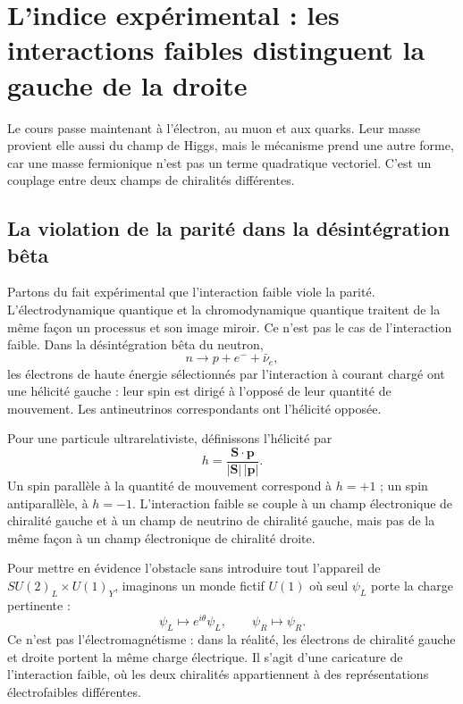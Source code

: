 \section{L’indice expérimental : les interactions faibles distinguent la gauche de la droite}

Le cours passe maintenant à l’électron, au muon et aux quarks. Leur masse provient elle aussi du champ de Higgs, mais le mécanisme prend une autre forme, car une masse fermionique n’est pas un terme quadratique vectoriel. C’est un couplage entre deux champs de chiralités différentes.

\subsection{La violation de la parité dans la désintégration bêta}

Partons du fait expérimental que l’interaction faible viole la parité. L’électrodynamique quantique et la chromodynamique quantique traitent de la même façon un processus et son image miroir. Ce n’est pas le cas de l’interaction faible. Dans la désintégration bêta du neutron, \begin{equation}
  n\longrightarrow p+e^-+\bar\nu_e,
  \label{eq:l09-beta-decay}
\end{equation}les électrons de haute énergie sélectionnés par l’interaction à courant chargé ont une hélicité gauche : leur spin est dirigé à l’opposé de leur quantité de mouvement. Les antineutrinos correspondants ont l’hélicité opposée.

Pour une particule ultrarelativiste, définissons l’hélicité par \begin{equation}
  h=\frac{\bm S\cdot\bm p}{|\bm S|\,|\bm p|}.
\end{equation}Un spin parallèle à la quantité de mouvement correspond à \(h=+1\) ; un spin antiparallèle, à \(h=-1\). L’interaction faible se couple à un champ électronique de chiralité gauche et à un champ de neutrino de chiralité gauche, mais pas de la même façon à un champ électronique de chiralité droite.

Pour mettre en évidence l’obstacle sans introduire tout l’appareil de \(SU(2)_L\times U(1)_Y\), imaginons un monde fictif \(U(1)\) où seul \(\psi_L\) porte la charge pertinente : \begin{equation}
  \psi_L\longmapsto e^{i\theta}\psi_L,
  \qquad
  \psi_R\longmapsto\psi_R .
  \label{eq:l09-chiral-toy-charge}
\end{equation}Ce n’est pas l’électromagnétisme : dans la réalité, les électrons de chiralité gauche et droite portent la même charge électrique. Il s’agit d’une caricature de l’interaction faible, où les deux chiralités appartiennent à des représentations électrofaibles différentes.

